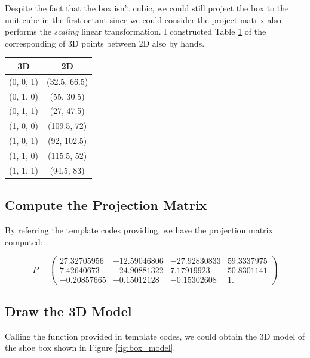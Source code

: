 \documentclass[12pt, a4paper]{article}
\begin{document}
Despite the fact that the box isn't cubic, we could still project the box to the unit cube in the first octant since we could consider the project matrix also performs the \emph{scaling} linear transformation. I constructed Table \ref{tab:box} of the corresponding of 3D points between 2D also by hands.

\begin{table}[htp]
\centering
\caption{Corresponding of 3D Points Between 2D}
\begin{longtable}[]{@{}cc@{}}
\toprule()
3D & 2D \\
\midrule()
\endhead
(0, 0, 1) & (32.5, 66.5) \\
(0, 1, 0) & (55, 30.5) \\
(0, 1, 1) & (27, 47.5) \\
(1, 0, 0) & (109.5, 72) \\
(1, 0, 1) & (92, 102.5) \\
(1, 1, 0) & (115.5, 52) \\
(1, 1, 1) & (94.5, 83) \\
\bottomrule()
\end{longtable}
\label{tab:box}
\end{table}%

\subsection{Compute the Projection Matrix}

By referring the template codes providing, we have the projection matrix computed:

\[
P=\begin{pmatrix}
 27.32705956 & -12.59046806 & -27.92830833 & 59.3337975 \\
  7.42640673 & -24.90881322 &   7.17919923 & 50.8301141 \\
 -0.20857665 &  -0.15012128 &  -0.15302608 &  1.
 \end{pmatrix}
 \]

\subsection{Draw the 3D Model}

Calling the function provided in template codes, we could obtain the 3D model of the shoe box shown in Figure \ref{fig:box_model}.
\end{document}
